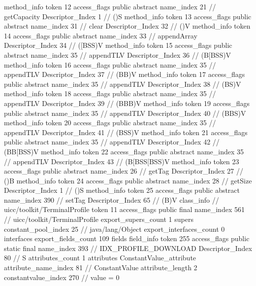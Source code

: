 {{{{{				}
				method_info {
					token	12
					access_flags	public abstract
					name_index	21		// getCapacity
					Descriptor_Index	1		// ()S
				}
				method_info {
					token	13
					access_flags	public abstract
					name_index	31		// clear
					Descriptor_Index	32		// ()V
				}
				method_info {
					token	14
					access_flags	public abstract
					name_index	33		// appendArray
					Descriptor_Index	34		// ([BSS)V
				}
				method_info {
					token	15
					access_flags	public abstract
					name_index	35		// appendTLV
					Descriptor_Index	36		// (B[BSS)V
				}
				method_info {
					token	16
					access_flags	public abstract
					name_index	35		// appendTLV
					Descriptor_Index	37		// (BB)V
				}
				method_info {
					token	17
					access_flags	public abstract
					name_index	35		// appendTLV
					Descriptor_Index	38		// (BS)V
				}
				method_info {
					token	18
					access_flags	public abstract
					name_index	35		// appendTLV
					Descriptor_Index	39		// (BBB)V
				}
				method_info {
					token	19
					access_flags	public abstract
					name_index	35		// appendTLV
					Descriptor_Index	40		// (BBS)V
				}
				method_info {
					token	20
					access_flags	public abstract
					name_index	35		// appendTLV
					Descriptor_Index	41		// (BSS)V
				}
				method_info {
					token	21
					access_flags	public abstract
					name_index	35		// appendTLV
					Descriptor_Index	42		// (BB[BSS)V
				}
				method_info {
					token	22
					access_flags	public abstract
					name_index	35		// appendTLV
					Descriptor_Index	43		// (B[BSS[BSS)V
				}
				method_info {
					token	23
					access_flags	public abstract
					name_index	26		// getTag
					Descriptor_Index	27		// ()B
				}
				method_info {
					token	24
					access_flags	public abstract
					name_index	28		// getSize
					Descriptor_Index	1		// ()S
				}
				method_info {
					token	25
					access_flags	public abstract
					name_index	390		// setTag
					Descriptor_Index	65		// (B)V
				}
			}
		}
		class_info {		// uicc/toolkit/TerminalProfile
			token	11
			access_flags	public final
			name_index	561		// uicc/toolkit/TerminalProfile
			export_supers_count	1
			supers {
				constant_pool_index	25		// java/lang/Object
			}
			export_interfaces_count	0
			interfaces {
			}
			export_fields_count	109
			fields {
			field_info {
				token	255
				access_flags	public static final
				name_index	393		// IDX_PROFILE_DOWNLOAD
				Descriptor_Index	80		// S
				attributes_count	1
				attributes {
				ConstantValue_attribute {
					attribute_name_index	81		// ConstantValue
					attribute_length	2
					constantvalue_index	270		// value = 0
}}}}}}}
